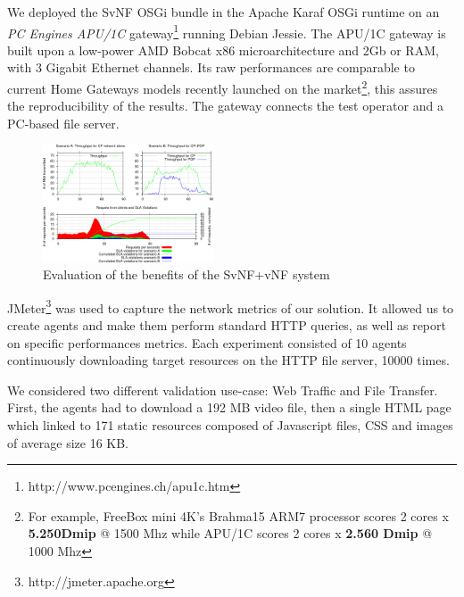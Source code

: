 We deployed the SvNF OSGi bundle in the Apache Karaf OSGi runtime on an \textit{PC Engines APU/1C} gateway\footnote{http://www.pcengines.ch/apu1c.htm} running Debian Jessie. 
The APU/1C gateway is built upon a low-power AMD Bobcat x86 microarchitecture and 2Gb or RAM, with 3 Gigabit Ethernet channels. Its raw performances are comparable to current Home Gateways models recently launched on the market\footnote{For example, FreeBox mini 4K's Brahma15 ARM7 processor scores 2 cores x \textbf{5.250Dmip} @ 1500 Mhz while APU/1C scores 2 cores x \textbf{2.560 Dmip} @ 1000 Mhz}, this assures the reproducibility of the results. The gateway connects the test operator and a PC-based file server.



\begin{figure}
  \begin{center}
    \includegraphics[width=0.45\textwidth]{fig/CP+POP_evaluation.pdf}
  \end{center}
  \caption{ Evaluation of the benefits of the SvNF+vNF system
    \label{fig:cppopeval}
  }
\end{figure}	







JMeter\footnote{http://jmeter.apache.org} was used to capture the network metrics of our solution.
It allowed us to create agents and make them perform standard HTTP queries, as well as report on specific performances metrics. Each experiment consisted of 10 agents continuously downloading target resources on the HTTP file server, 10000 times.

We considered two different validation use-case: Web Traffic and File Transfer. First, the agents had to download a 192 MB video file, then a single HTML page which linked to 171 static resources composed of Javascript files, CSS and images of average size 16 KB.

